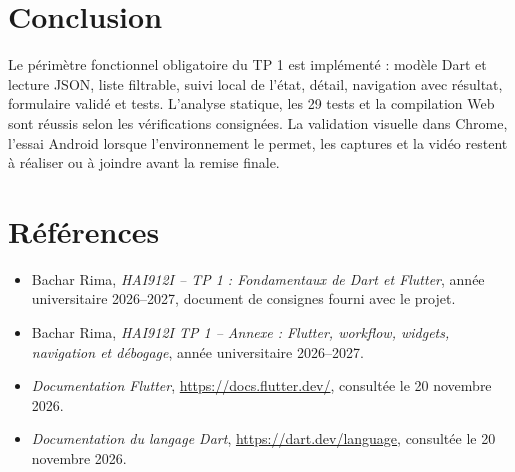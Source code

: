\documentclass[12pt,a4paper]{report}
\begin{document}
\chapter{Conclusion}

Le périmètre fonctionnel obligatoire du TP 1 est implémenté : modèle Dart et lecture JSON, liste filtrable, suivi local de l’état, détail, navigation avec résultat, formulaire validé et tests. L’analyse statique, les 29 tests et la compilation Web sont réussis selon les vérifications consignées. La validation visuelle dans Chrome, l’essai Android lorsque l’environnement le permet, les captures et la vidéo restent à réaliser ou à joindre avant la remise finale.

\chapter{Références}

\begin{itemize}
  \item Bachar Rima, \emph{HAI912I -- TP 1 : Fondamentaux de Dart et Flutter}, année universitaire 2026--2027, document de consignes fourni avec le projet.
  \item Bachar Rima, \emph{HAI912I TP 1 -- Annexe : Flutter, workflow, widgets, navigation et débogage}, année universitaire 2026--2027.
  \item \emph{Documentation Flutter}, \url{https://docs.flutter.dev/}, consultée le 20 novembre 2026.
  \item \emph{Documentation du langage Dart}, \url{https://dart.dev/language}, consultée le 20 novembre 2026.
\end{itemize}
\end{document}
